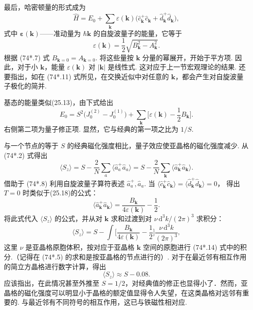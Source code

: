 最后，哈密顿量的形式成为
\begin{equation*}
\hat{H}=E_0+\sum_{\bm{k}}\varepsilon(\bm{k})
\bigl(\hat{c}_{\bm{k}}^{+}\hat{c}_{\bm{k}}+\hat{d}_{\bm{k}}^{+}\hat{d}_{\bm{k}}\bigr),
\tag{74*.11}
\end{equation*}
式中 $\bm{\varepsilon}(\bm{k})$——准动量为 $\hbar\bm{k}$ 的自旋波量子的能量，它等于
\begin{equation*}
\varepsilon(\bm{k})=\frac{1}{2}\sqrt{B_{\bm{k}}^2-A_{\bm{k}}^2}.
\tag{74*.12}
\end{equation*}
根据 (74*.7) 式 $B_{\bm{k}=0}=A_{\bm{k}=0}$. 将这些量按 $\bm{k}$ 分量的幂展开，开始于平方项. 因此，对于小 $\bm{k}$，能量 $\varepsilon(\bm{k})$ 对 $|\bm{k}|$ 是线性式. 这对应于上一节宏观理论的结果. 还要指出，如在 (74*.11) 式所见，在交换近似中对任意的 $\bm{k}$，都会产生对自旋波量子极化的简并.

基态的能量类似(25.13)，由下式给出
\begin{equation*}
E_0=S^2\bigl(J_0^{(2)}-J_0^{(1)}\bigr)
+\sum_{\bm{k}}\biggl[\varepsilon(\bm{k})-\frac{1}{2}B_{\bm{k}}\biggr].
\tag{74*.13}
\end{equation*}
右侧第二项为量子修正项. 显然，它与经典的第一项之比为 $1/S$.

与一个节点的等于 $S$ 的经典磁化强度相比，量子效应使亚晶格的磁化强度减少. 从 (74*.2) 式得出
\begin{equation*}
\langle S_z\rangle=S-\frac{2}{N}\sum_a
\langle\hat{a}_a^{+}\hat{a}_a\rangle
=S-\frac{2}{N}\sum_{\bm{k}}
\langle\hat{a}_{\bm{k}}^{+}\hat{a}_{\bm{k}}\rangle.
\end{equation*}
借助于 (74*.8) 利用自旋波量子算符表述 $\hat{a}_a^{+},\hat{a}_a$. 当
$\langle\hat{c}_{\bm{k}}^{+}\hat{c}_{\bm{k}}\rangle
=\langle\hat{d}_{\bm{k}}^{+}\hat{d}_{\bm{k}}\rangle=0$，
得出 $T=0$ 时类似于(25.18)的公式：
\begin{equation*}
\langle\hat{a}_{\bm{k}}^{+}\hat{a}_{\bm{k}}\rangle
=\frac{B_{\bm{k}}}{4\varepsilon(\bm{k})}-\frac{1}{2}.
\end{equation*}
将此式代入 $\langle S_z\rangle$ 的公式，并从对 $\bm{k}$ 求和过渡到对 $\nu\,\mathrm{d}^3k/(2\pi)^3$ 求积分：
\begin{equation*}
\langle S_z\rangle=S-\int\biggl[\frac{B_{\bm{k}}}{4\varepsilon(\bm{k})}
-\frac{1}{2}\biggr]\frac{\nu\,\mathrm{d}^3k}{(2\pi)^3},
\tag{74*.14}
\end{equation*}
这里 $\nu$ 是亚晶格原胞体积，按对应于亚晶格 $\bm{k}$ 空间的原胞进行 (74*.14) 式中的积分.（记得在 (74*.5) 的求和是按亚晶格的节点进行的）. 对于在最近邻有相互作用的简立方晶格进行数字计算，得出
\begin{equation*}
\langle S_z\rangle\approx S-0.08.
\end{equation*}
应该指出，在此情况甚至外推至 $S=1/2$，对经典值的修正也显得小了．然而，亚晶格的磁化强度可以明显小于晶格的额定值显得令人失望，在这类晶格对远邻有重要的. 与最近邻有不同符号的相互作用，这已与铁磁性相对应.
